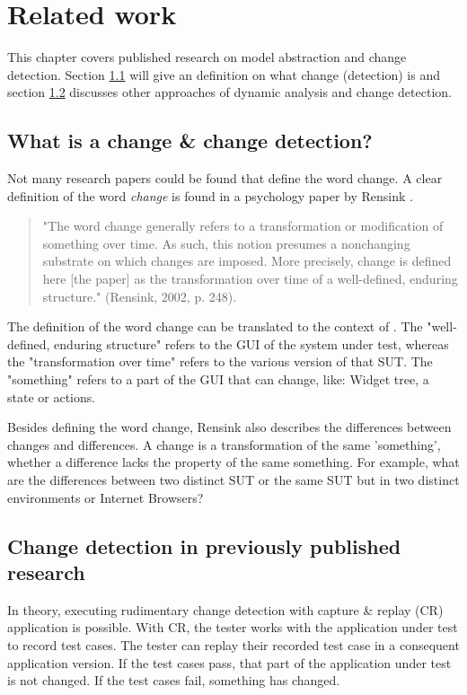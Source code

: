 \chapter{Related work}

This chapter covers published research on model abstraction and change detection. Section \ref{sec:what-is-change} will give an definition on what change (detection) is and section \ref{sec:change-detection-research} discusses other approaches of dynamic analysis and change detection. 
\section{What is a change \& change detection?} \label{sec:what-is-change}

Not many research papers could be found that define the word change. A clear definition of the word \textit{change} is found in a psychology paper by Rensink \cite{rensink2002change}.

\begin{quote}
    "The word change generally refers to a transformation or modification of something over time. As such, this notion presumes a nonchanging substrate on which changes are imposed. More precisely, change is defined here [the paper] as the transformation over time of a well-defined, enduring structure." (Rensink, 2002, p. 248).
\end{quote}

The definition of the word change can be translated to the context of \testar. The "well-defined, enduring structure" refers to the GUI of the system under test, whereas the "transformation over time" refers to the various version of that SUT. The "something" refers to a part of the GUI that can change, like: Widget tree, a state or actions. 

Besides defining the word change, Rensink also describes the differences between changes and differences. A change is a transformation of the same 'something', whether a difference lacks the property of the same something. For example, what are the differences between two distinct SUT or the same SUT but in two distinct environments or Internet Browsers?

\section{Change detection in previously published research} \label{sec:change-detection-research}

In theory, executing rudimentary change detection with capture \& replay (CR) application is possible. With CR, the tester works with the application under test to record test cases. The tester can replay their recorded test case in a consequent application version. If the test cases pass, that part of the application under test is not changed. If the test cases fail, something has changed. 

